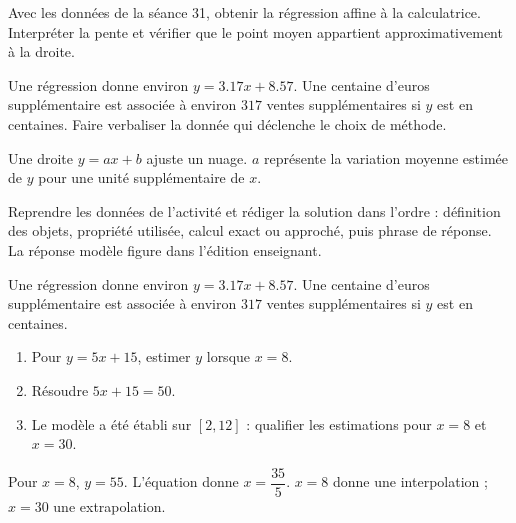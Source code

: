 \begin{activity}
Avec les données de la séance 31, obtenir la régression affine à la calculatrice. Interpréter la pente et vérifier que le point moyen appartient approximativement à la droite.
\begin{center}\end{center}
\end{activity}
\begin{solution}Une régression donne environ $y=\num{3,17}x+\num{8,57}$. Une centaine d'euros supplémentaire est associée à environ $317$ ventes supplémentaires si $y$ est en centaines. Faire verbaliser la donnée qui déclenche le choix de méthode.\end{solution}

\begin{summary}Une droite $y=ax+b$ ajuste un nuage. $a$ représente la variation moyenne estimée de $y$ pour une unité supplémentaire de $x$.\end{summary}

\begin{example}
Reprendre les données de l'activité et rédiger la solution dans l'ordre : définition des objets, propriété utilisée, calcul exact ou approché, puis phrase de réponse. La réponse modèle figure dans l'édition enseignant.
\end{example}
\begin{solution}Une régression donne environ $y=\num{3,17}x+\num{8,57}$. Une centaine d'euros supplémentaire est associée à environ $317$ ventes supplémentaires si $y$ est en centaines.\end{solution}

\begin{exercise}[essentiel]
\begin{enumerate}\item Pour $y=5x+15$, estimer $y$ lorsque $x=8$.\item Résoudre $5x+15=50$.\item Le modèle a été établi sur $[2,12]$ : qualifier les estimations pour $x=8$ et $x=30$.\end{enumerate}
\end{exercise}
\begin{solution}Pour $x=8$, $y=55$. L'équation donne $x=\dfrac{35}{5}$. $x=8$ donne une interpolation ; $x=30$ une extrapolation.\end{solution}

